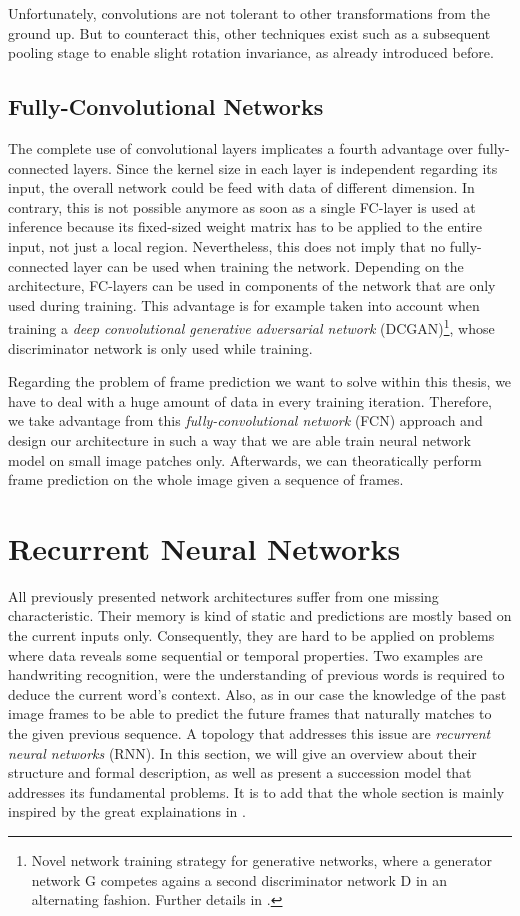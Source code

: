 Unfortunately, convolutions are not tolerant to other transformations from the ground up. But to counteract this, other techniques exist such as a subsequent pooling stage to enable slight rotation invariance, as already introduced before.


\subsection{Fully-Convolutional Networks}

The complete use of convolutional layers implicates a fourth advantage over fully-connected layers. Since the kernel size in each layer is independent regarding its input, the overall network could be feed with data of different dimension. In contrary, this is not possible anymore as soon as a single FC-layer is used at inference because its fixed-sized weight matrix has to be applied to the entire input, not just a local region. Nevertheless, this does not imply that no fully-connected layer can be used when training the network. Depending on the architecture, FC-layers can be used in components of the network that are only used during training. This advantage is for example taken into account when training a \textit{deep convolutional generative adversarial network} (DCGAN)\footnote{Novel network training strategy for generative networks, where a generator network G competes agains a second discriminator network D in an alternating fashion. Further details in \parencite{gan}.}, whose discriminator network is only used while training.

Regarding the problem of frame prediction we want to solve within this thesis, we have to deal with a huge amount of data in every training iteration. Therefore, we take advantage from this \textit{fully-convolutional network} (FCN) approach and design our architecture in such a way that we are able train neural network model on small image patches only. Afterwards, we can theoratically perform frame prediction on the whole image given a sequence of frames.


\section{Recurrent Neural Networks}

All previously presented network architectures suffer from one missing characteristic. Their memory is kind of static and predictions are mostly based on the current inputs only. Consequently, they are hard to be applied on problems where data reveals some sequential or temporal properties. Two examples are handwriting recognition, were the understanding of previous words is required to deduce the current word's context. Also, as in our case the knowledge of the past image frames to be able to predict the future frames that naturally matches to the given previous sequence. A topology that addresses this issue are \textit{recurrent neural networks} (RNN). In this section, we will give an overview about their structure and formal description, as well as present a succession model that addresses its fundamental problems. It is to add that the whole section is mainly inspired by the great explainations in \parencite{understand_lstm}.



